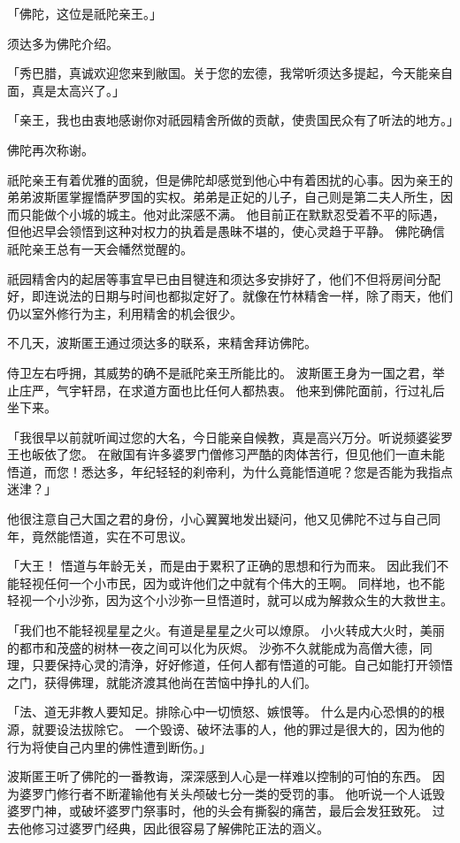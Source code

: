 \documentclass[twoside,openany]{book}
\begin{document}
「佛陀，这位是祇陀亲王。」

须达多为佛陀介绍。

「秀巴腊，真诚欢迎您来到敝国。关于您的宏德，我常听须达多提起，今天能亲自面，真是太高兴了。」

「亲王，我也由衷地感谢你对祇园精舍所做的贡献，使贵国民众有了听法的地方。」

佛陀再次称谢。

祇陀亲王有着优雅的面貌，但是佛陀却感觉到他心中有着困扰的心事。因为亲王的弟弟波斯匿掌握憍萨罗国的实权。弟弟是正妃的儿子，自己则是第二夫人所生，因而只能做个小城的城主。他对此深感不满。
他目前正在默默忍受着不平的际遇，但他迟早会领悟到这种对权力的执着是愚昧不堪的，使心灵趋于平静。
佛陀确信祇陀亲王总有一天会幡然觉醒的。

祇园精舍内的起居等事宜早已由目犍连和须达多安排好了，他们不但将房间分配好，即连说法的日期与时间也都拟定好了。就像在竹林精舍一样，除了雨天，他们仍以室外修行为主，利用精舍的机会很少。

不几天，波斯匿王通过须达多的联系，来精舍拜访佛陀。

侍卫左右呼拥，其威势的确不是祇陀亲王所能比的。
波斯匿王身为一国之君，举止庄严，气宇轩昂，在求道方面也比任何人都热衷。
他来到佛陀面前，行过礼后坐下来。

「我很早以前就听闻过您的大名，今日能亲自候教，真是高兴万分。听说频婆娑罗王也皈依了您。
在敝国有许多婆罗门僧修习严酷的肉体苦行，但见他们一直未能悟道，而您！悉达多，年纪轻轻的刹帝利，为什么竟能悟道呢？您是否能为我指点迷津？」

他很注意自己大国之君的身份，小心翼翼地发出疑问，他又见佛陀不过与自己同年，竟然能悟道，实在不可思议。

「大王！
悟道与年龄无关，而是由于累积了正确的思想和行为而来。
因此我们不能轻视任何一个小市民，因为或许他们之中就有个伟大的王啊。
同样地，也不能轻视一个小沙弥，因为这个小沙弥一旦悟道时，就可以成为解救众生的大救世主。

「我们也不能轻视星星之火。有道是星星之火可以燎原。
小火转成大火时，美丽的都市和茂盛的树林一夜之间可以化为灰烬。
沙弥不久就能成为高僧大德，同理，只要保持心灵的清浄，好好修道，任何人都有悟道的可能。自己如能打开领悟之门，获得佛理，就能济渡其他尚在苦恼中挣扎的人们。

「法、道无非教人要知足。排除心中一切愤怒、嫉恨等。
什么是内心恐惧的的根源，就要设法拔除它。
一个毁谤、破坏法事的人，他的罪过是很大的，因为他的行为将使自己内里的佛性遭到断伤。」

波斯匿王听了佛陀的一番教诲，深深感到人心是一样难以控制的可怕的东西。
因为婆罗门修行者不断灌输他有关头颅破七分一类的受罚的事。
他听说一个人诋毁婆罗门神，或破坏婆罗门祭事时，他的头会有撕裂的痛苦，最后会发狂致死。
过去他修习过婆罗门经典，因此很容易了解佛陀正法的涵义。
\end{document}
